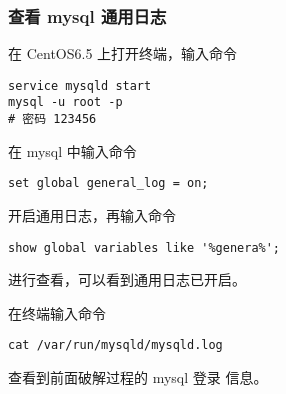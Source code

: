 \subsubsection{查看 mysql 通用日志}
在 CentOS6.5 上打开终端，输入命令
\begin{verbatim}
service mysqld start
mysql -u root -p
# 密码 123456
\end{verbatim}

在 mysql 中输入命令
\begin{verbatim}
set global general_log = on;
\end{verbatim}
开启通用日志，再输入命令
\begin{verbatim}
show global variables like '%genera%';
\end{verbatim}
进行查看，可以看到通用日志已开启。

在终端输入命令
\begin{verbatim}
cat /var/run/mysqld/mysqld.log
\end{verbatim}
查看到前面破解过程的 mysql 登录
信息。

